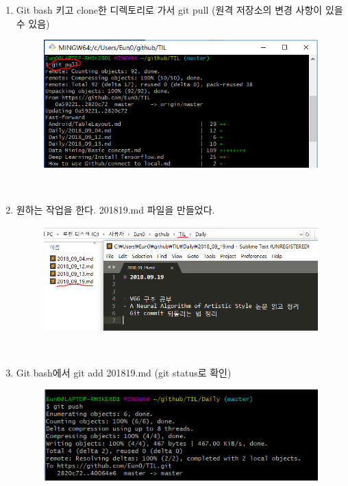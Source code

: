 \documentclass[a4paper]{article}
\begin{document}
	\begin{enumerate}
		\item Git bash 키고 clone한 디렉토리로 가서 git pull (원격 저장소의 변경 사항이 있을 수 있음)
		\begin{figure}[htbp]
			\begin{center}
				\includegraphics[scale=0.8]{source/1}
			\end{center}
		\end{figure}\\
		\item 원하는 작업을 한다. 2018\textunderscore19.md 파일을 만들었다.
		\begin{figure}[htbp]
			\begin{center}
				\includegraphics[scale=0.8]{source/2}
			\end{center}
		\end{figure}\\
		\item Git bash에서 git add 2018\textunderscore19.md (git status로 확인)
		\begin{figure}[htbp]
			\begin{center}
				\includegraphics[scale=0.8]{source/6}

\end{center}
\end{figure}
\end{enumerate}
\end{document}
